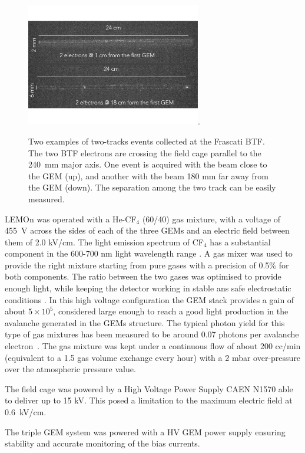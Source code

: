 \documentclass[review]{elsarticle}
\begin{document}
\begin{figure}[!ht]
\centering
\includegraphics[width=3in]{Fig3-tracks.pdf}\DeclareGraphicsExtensions.
\caption{Two examples of  two-tracks events collected at the Frascati BTF. The two BTF electrons are crossing the field cage parallel  to  the  240~mm major axis. One event is acquired with the beam close to the GEM (up), and another with the beam 180 mm far away  from the GEM (down). The separation among the two track can be easily measured.}
\label{fig:track}
\end{figure}

LEMOn was operated with a He-CF$_4$ (60/40) gas mixture, with a voltage of 455~V across the sides of each of the three GEMs and an electric field between them of 2.0 kV/cm. The light emission spectrum of CF$_4$ has a substantial component in the 600-700 nm light wavelength range \cite{FRAGA200388}. A gas mixer was used to provide the right mixture starting from pure gases with a precision of 0.5\% for both components. The ratio between the two gases was optimised to provide enough light, while keeping the detector working in stable ans safe electrostatic conditions \cite{bib:stab}.
In this high voltage configuration the GEM stack provides a gain of about $5\times10^5$, considered large enough to reach a good light production in  the avalanche generated in the  GEMs structure. The typical photon yield for this  type of gas mixtures has been measured to be around  0.07 photons per avalanche electron~\cite{bib:jinst_orange1, bib:roby, bib:tesinatalia}.
The gas mixture was kept under a continuous flow of about 200 cc/min (equivalent to a 1.5 gas volume exchange every hour) with a 2 mbar over-pressure over the atmospheric pressure value.

The field cage was powered by a High Voltage Power Supply CAEN N1570\cite{CAENN1570} able to deliver up to 15 kV. 
This posed a limitation to the maximum  electric field  at 0.6~kV/cm. 

The triple GEM system was powered with a HV GEM power supply \cite{Corradi:2007df} ensuring stability and accurate monitoring of the bias currents.
\end{document}
